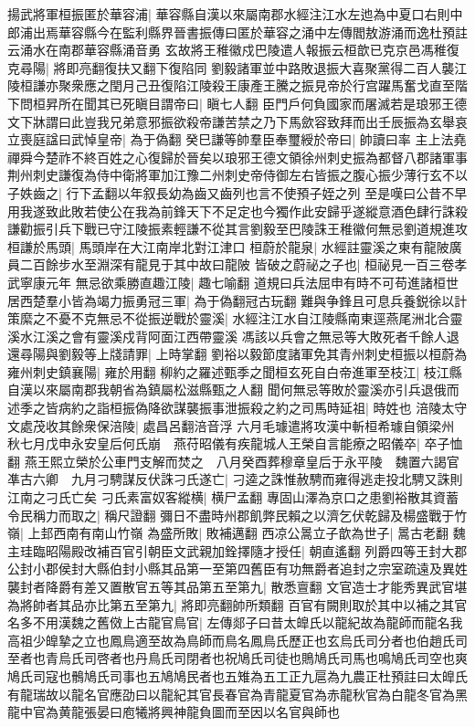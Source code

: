 揚武將軍桓振匿於華容浦|{
	華容縣自漢以來屬南郡水經注江水左迆為中夏口右則中郎浦出焉華容縣今在監利縣界晉書振傳曰匿於華容之涌中左傳閻敖游涌而逸杜預註云涌水在南郡華容縣涌音勇}
玄故將王稚徽戍巴陵遣人報振云桓歆已克京邑馮稚復克尋陽|{
	將即亮翻復扶又翻下復陷同}
劉毅諸軍並中路敗退振大喜聚黨得二百人襲江陵桓謙亦聚衆應之閏月己丑復陷江陵殺王康產王騰之振見帝於行宫躍馬奮戈直至階下問桓昇所在聞其已死瞋目謂帝曰|{
	瞋七人翻}
臣門戶何負國家而屠滅若是琅邪王德文下牀謂曰此豈我兄弟意邪振欲殺帝謙苦禁之乃下馬歛容致拜而出壬辰振為玄舉哀立喪庭諡曰武悼皇帝|{
	為于偽翻}
癸巳謙等帥羣臣奉璽綬於帝曰|{
	帥讀曰率}
主上法堯禪舜今楚祚不終百姓之心復歸於晉矣以琅邪王德文領徐州刺史振為都督八郡諸軍事荆州刺史謙復為侍中衛將軍加江豫二州刺史帝侍御左右皆振之腹心振少薄行玄不以子妷齒之|{
	行下孟翻以年叙長幼為齒又齒列也言不使預子姪之列}
至是嘆曰公昔不早用我遂致此敗若使公在我為前鋒天下不足定也今獨作此安歸乎遂縱意酒色肆行誅殺謙勸振引兵下戰已守江陵振素輕謙不從其言劉毅至巴陵誅王稚徽何無忌劉道規進攻桓謙於馬頭|{
	馬頭岸在大江南岸北對江津口}
桓蔚於龍泉|{
	水經註靈溪之東有龍陂廣員二百餘步水至淵深有龍見于其中故曰龍陂}
皆破之蔚祕之子也|{
	桓祕見一百三卷孝武寧康元年}
無忌欲乘勝直趣江陵|{
	趣七喻翻}
道規曰兵法屈申有時不可苟進諸桓世居西楚羣小皆為竭力振勇冠三軍|{
	為于偽翻冠古玩翻}
難與争鋒且可息兵養鋭徐以計策縻之不憂不克無忌不從振逆戰於靈溪|{
	水經注江水自江陵縣南東逕燕尾洲北合靈溪水江溪之會有靈溪戍背阿面江西帶靈溪}
馮該以兵會之無忌等大敗死者千餘人退還尋陽與劉毅等上牋請罪|{
	上時掌翻}
劉裕以毅節度諸軍免其青州刺史桓振以桓蔚為雍州刺史鎮襄陽|{
	雍於用翻}
柳約之羅述甄季之聞桓玄死自白帝進軍至枝江|{
	枝江縣自漢以來屬南郡我朝省為鎮屬松滋縣甄之人翻}
聞何無忌等敗於靈溪亦引兵退俄而述季之皆病約之詣桓振偽降欲謀襲振事泄振殺之約之司馬時延祖|{
	時姓也}
涪陵太守文處茂收其餘衆保涪陵|{
	處昌呂翻涪音浮}
六月毛璩遣將攻漢中斬桓希璩自領梁州　秋七月戊申永安皇后何氏崩　燕苻昭儀有疾龍城人王榮自言能療之昭儀卒|{
	卒子恤翻}
燕王熙立榮於公車門支解而焚之　八月癸酉葬穆章皇后于永平陵　魏置六謁官凖古六卿　九月刁騁謀反伏誅刁氏遂亡|{
	刁逵之誅惟赦騁而雍得逃走投北騁又誅則江南之刁氏亡矣}
刁氏素富奴客縱横|{
	横尸孟翻}
專固山澤為京口之患劉裕散其資蓄令民稱力而取之|{
	稱尺證翻}
彌日不盡時州郡飢弊民賴之以濟乞伏乾歸及楊盛戰于竹嶺|{
	上邽西南有南山竹嶺}
為盛所敗|{
	敗補邁翻}
西凉公暠立子歆為世子|{
	暠古老翻}
魏主珪臨昭陽殿改補百官引朝臣文武親加銓擇隨才授任|{
	朝直遙翻}
列爵四等王封大郡公封小郡侯封大縣伯封小縣其品第一至第四舊臣有功無爵者追封之宗室疏遠及異姓襲封者降爵有差又置散官五等其品第五至第九|{
	散悉亶翻}
文官造士才能秀異武官堪為將帥者其品亦比第五至第九|{
	將即亮翻帥所類翻}
百官有闕則取於其中以補之其官名多不用漢魏之舊傚上古龍官鳥官|{
	左傳郯子曰昔太皥氏以龍紀故為龍師而龍名我高祖少皥摯之立也鳳鳥適至故為鳥師而鳥名鳳鳥氏歷正也玄烏氏司分者也伯趙氏司至者也青烏氏司啓者也丹鳥氏司閉者也祝鳩氏司徒也鵙鳩氏司馬也鳴鳩氏司空也爽鳩氏司寇也鶻鳩氏司事也五鳩鳩民者也五雉為五工正九扈為九農正杜預註曰太皥氏有龍瑞故以龍名官應劭曰以龍紀其官長春官為青龍夏官為赤龍秋官為白龍冬官為黑龍中官為黄龍張晏曰庖犧將興神龍負圖而至因以名官與師也}
